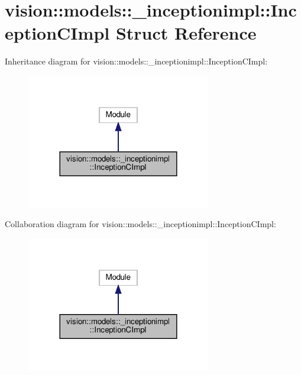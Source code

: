 \hypertarget{structvision_1_1models_1_1__inceptionimpl_1_1InceptionCImpl}{}\section{vision\+:\+:models\+:\+:\+\_\+inceptionimpl\+:\+:Inception\+C\+Impl Struct Reference}
\label{structvision_1_1models_1_1__inceptionimpl_1_1InceptionCImpl}


Inheritance diagram for vision\+:\+:models\+:\+:\+\_\+inceptionimpl\+:\+:Inception\+C\+Impl\+:
\nopagebreak
\begin{figure}[H]
\begin{center}
\leavevmode
\includegraphics[width=228pt]{structvision_1_1models_1_1__inceptionimpl_1_1InceptionCImpl__inherit__graph}
\end{center}
\end{figure}


Collaboration diagram for vision\+:\+:models\+:\+:\+\_\+inceptionimpl\+:\+:Inception\+C\+Impl\+:
\nopagebreak
\begin{figure}[H]
\begin{center}
\leavevmode
\includegraphics[width=228pt]{structvision_1_1models_1_1__inceptionimpl_1_1InceptionCImpl__coll__graph}
\end{center}
\end{figure}
